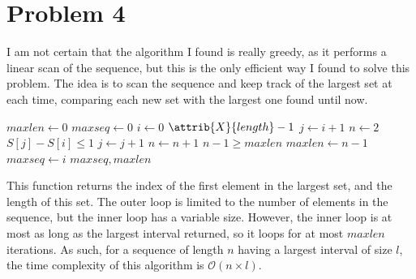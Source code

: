 \documentclass[a4paper, 10pt, twoside]{article}
\begin{document}
\section*{Problem 4}

I am not certain that the algorithm I found is really greedy, as it performs a linear scan of the sequence, but this is the only efficient way I found to solve this problem. The idea is to scan the sequence and keep track of the largest set at each time, comparing each new set with the largest one found until now.

\begin{codebox}
	\zi $maxlen \gets 0$
	\zi $maxseq \gets 0$
	\zi \For $i \gets 0$ \To $\attrib{X}{length}-1$ \Do
	\zi $j \gets i+1$
	\zi $n \gets 2$
	\zi \While $S[j] - S[i] \leq 1$ \Do
	\zi $j \gets j+1$
	\zi $n \gets n+1$ \End
	\zi \If $n-1 \ge maxlen$ \Do
	\zi $maxlen \gets n-1$
	\zi $maxseq \gets i$ \End
	\zi \Return $maxseq, maxlen$
\end{codebox}

This function returns the index of the first element in the largest set, and the length of this set. The outer loop is limited to the number of elements in the sequence, but the inner loop has a variable size. However, the inner loop is at most as long as the largest interval returned, so it loops for at most $maxlen$ iterations. As such, for a sequence of length $n$ having a largest interval of size $l$, the time complexity of this algorithm is $\mathcal{O}(n \times l)$. 
\end{document}
